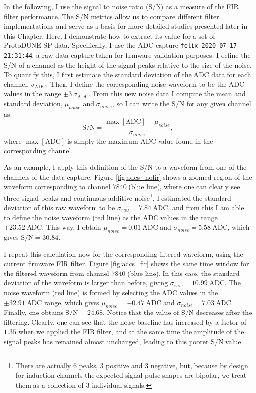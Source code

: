 In the following, I use the signal to noise ratio (S/N) as a measure of the FIR filter performance. The S/N metrics allow us to compare different filter implementations and serve as a basis for more detailed studies presented later in this Chapter. Here, I demonstrate how to extract its value for a set of 
ProtoDUNE-SP data. Specifically, I use the ADC capture \texttt{felix-2020-07-17-21:31:44}, a raw data capture taken for firmware validation purposes. I define the S/N of a channel as the height of the signal peaks relative to the size of the noise. To quantify this, I first estimate the standard deviation of the ADC data for each channel, $\sigma_{\mathrm{ADC}}$. Then, I define the corresponding noise waveform to be the ADC values in the range $\pm 3~\sigma_{\mathrm{ADC}}$. From this new noise data I compute the mean and standard deviation, $\mu_{noise}$ and $\sigma_{noise}$, so I can write the S/N for any given channel as:
\begin{equation}
	\mathrm{S/N} = \frac{\max{[\mathrm{ADC}]} - \mu_{noise}}{\sigma_{noise}},
\end{equation}
where $\max{[\mathrm{ADC}]}$ is simply the maximum ADC value found in the corresponding channel.

As an example, I apply this definition of the S/N to a waveform from one of the channels of the data capture. Figure \ref{fig:adcs_nofir} shows a zoomed region of the waveform corresponding to channel $7840$ (blue line), where one can clearly see three signal peaks and continuous additive noise\footnote{There are actually 6 peaks, 3 positive and 3 negative, but, because by design for induction channels the expected signal pulse shapes are bipolar, we treat them as a collection of 3 individual signals.}. I estimated the standard deviation of this raw waveform to be $\sigma_{raw} = 7.84 ~ \mathrm{ADC}$, and from this I am able to define the noise waveform (red line) as the ADC values in the range $\pm 23.52 ~ \mathrm{ADC}$. This way, I obtain $\mu_{noise} = 0.01 ~ \mathrm{ADC}$ and $\sigma_{noise} = 5.58 ~ \mathrm{ADC}$, which gives $\mathrm{S/N} = 30.84$.

I repeat this calculation now for the corresponding filtered waveform, using the current firmware FIR filter. Figure \ref{fig:adcs_fir} shows the same time window for the filtered waveform from channel $7840$ (blue line). In this case, the standard deviation of the waveform is larger than before, giving $\sigma_{raw} = 10.99 ~ \mathrm{ADC}$. The noise waveform (red line) is formed by selecting the ADC values in the $\pm 32.91 ~ \mathrm{ADC}$ range, which gives $\mu_{noise} = -0.47 ~ \mathrm{ADC}$ and $\sigma_{noise} = 7.03 ~ \mathrm{ADC}$. Finally, one obtains $\mathrm{S/N} = 24.68$. Notice that the value of S/N decreases after the filtering. Clearly, one can see that the noise baseline has increased by a factor of $1.35$ when we applied the FIR filter, and at the same time the amplitude of the signal peaks has remained almost unchanged, leading to this poorer S/N value.

